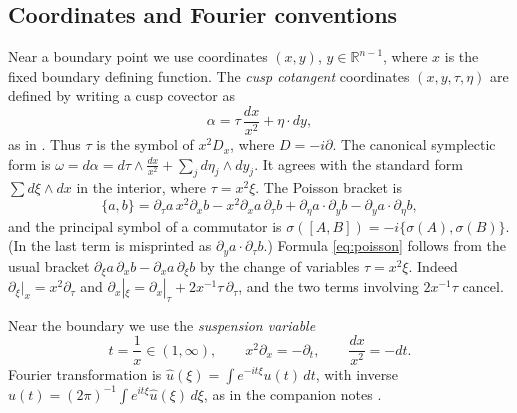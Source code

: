 \documentclass[11pt,oneside,reqno]{article}
\newcommand{\R}{\mathbb R}
\theoremstyle{plain}
\theoremstyle{definition}
\theoremstyle{remark}
\begin{document}
\subsection{Coordinates and Fourier conventions}\label{subsec:coords}
Near a boundary point we use coordinates \((x,y)\), \(y\in\R^{n-1}\),
where \(x\) is the fixed boundary defining function. The \emph{cusp
cotangent} coordinates \((x,y,\tau,\eta)\) are defined by writing a cusp
covector as
\begin{equation}\label{eq:cuspcovector}
 \alpha=\tau\,\frac{dx}{x^2}+\eta\cdot dy ,
\end{equation}
as in \cite[(139)]{MN}. Thus \(\tau\) is the symbol of \(x^2D_x\), where
\(D=-i\partial\). The canonical symplectic form is
\(\omega=d\alpha=d\tau\wedge\frac{dx}{x^2}+\sum_jd\eta_j\wedge dy_j\). It
agrees with the standard form \(\sum d\xi\wedge dx\) in the interior, where
\(\tau=x^2\xi\). The Poisson bracket is
\begin{equation}\label{eq:poisson}
 \{a,b\}=\partial_\tau a\,x^2\partial_xb-x^2\partial_xa\,\partial_\tau b
 +\partial_\eta a\cdot\partial_yb-\partial_ya\cdot\partial_\eta b ,
\end{equation}
and the principal symbol of a commutator is
\(\sigma([A,B])=-i\{\sigma(A),\sigma(B)\}\). (In \cite[(139)]{MN} the
last term is misprinted as \(\partial_ya\cdot\partial_\tau b\).)
Formula \eqref{eq:poisson} follows from the usual bracket
\(\partial_\xi a\,\partial_xb-\partial_xa\,\partial_\xi b\) by the change of
variables \(\tau=x^2\xi\). Indeed \(\partial_\xi|_x=x^2\partial_\tau\) and
\(\partial_x|_\xi=\partial_x|_\tau+2x^{-1}\tau\,\partial_\tau\), and the two
terms involving \(2x^{-1}\tau\) cancel.

Near the boundary we use the \emph{suspension variable}
\begin{equation}\label{eq:t}
 t=\frac1x\in(1,\infty),\qquad x^2\partial_x=-\partial_t,\qquad
 \frac{dx}{x^2}=-dt .
\end{equation}
Fourier transformation is \(\hat u(\xi)=\int e^{-it\xi}u(t)\,dt\), with
inverse \(u(t)=(2\pi)^{-1}\int e^{it\xi}\hat u(\xi)\,d\xi\), as in the
companion notes \cite{Notes,HHb}.
\end{document}
